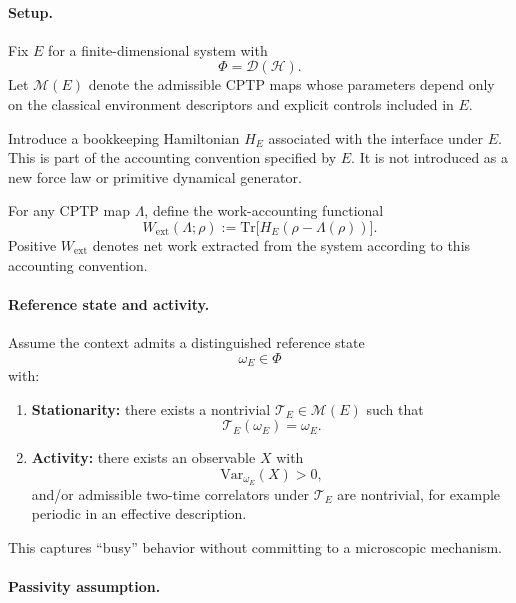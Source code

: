 \documentclass[aps,prx,onecolumn,11pt]{revtex4-2}
\theoremstyle{plain}
\theoremstyle{definition}
\theoremstyle{remark}
\begin{document}
\paragraph{Setup.}

Fix \(E\) for a finite-dimensional system with
\[
\Phi=\mathcal D(\mathcal H).
\]
Let \(\mathcal M(E)\) denote the admissible CPTP maps whose parameters
depend only on the classical environment descriptors and explicit
controls included in \(E\).

Introduce a bookkeeping Hamiltonian \(H_E\) associated with the
interface under \(E\). This is part of the accounting convention
specified by \(E\). It is not introduced as a new force law or
primitive dynamical generator.

For any CPTP map \(\Lambda\), define the work-accounting functional
\begin{equation}
W_{\mathrm{ext}}(\Lambda;\rho)
:=
\mathrm{Tr}\!\bigl[H_E(\rho-\Lambda(\rho))\bigr].
\label{eq:toy_work_def}
\end{equation}
Positive \(W_{\mathrm{ext}}\) denotes net work extracted from the
system according to this accounting convention.

\paragraph{Reference state and activity.}

Assume the context admits a distinguished reference state
\[
\omega_E\in\Phi
\]
with:

\begin{enumerate}[label=(\roman*), leftmargin=2em]
\item \textbf{Stationarity:} there exists a nontrivial
\(\mathcal T_E\in\mathcal M(E)\) such that
\[
\mathcal T_E(\omega_E)=\omega_E.
\]

\item \textbf{Activity:} there exists an observable \(X\) with
\[
\mathrm{Var}_{\omega_E}(X)>0,
\]
and/or admissible two-time correlators under \(\mathcal T_E\) are
nontrivial, for example periodic in an effective description.
\end{enumerate}

This captures ``busy'' behavior without committing to a microscopic
mechanism.

\paragraph{Passivity assumption.}
\end{document}
